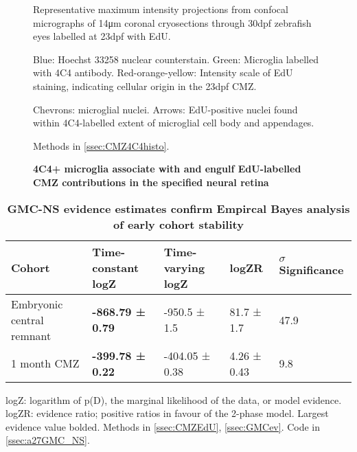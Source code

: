 \begin{figure}[!h]
    \caption{{\bf 4C4+ microglia associate with and engulf EdU-labelled CMZ contributions in the specified neural retina}}
    Representative maximum intensity projections from confocal micrographs of 14\si{\micro\metre} coronal cryosections through 30dpf zebrafish eyes labelled at 23dpf with EdU.
    
    Blue: Hoechst 33258 nuclear counterstain. Green: Microglia labelled with 4C4 antibody. Red-orange-yellow: Intensity scale of EdU staining, indicating cellular origin in the 23dpf CMZ.

    Chevrons: microglial nuclei. Arrows: EdU-positive nuclei found within 4C4-labelled extent of microglial cell body and appendages.
    
    Methods in \autoref{ssec:CMZ4C4histo}.
    \label{4C4micrograph}
\end{figure}

\begin{table}[!ht]
    \centering
    \caption{{\bf GMC-NS evidence estimates confirm Empircal Bayes analysis of early cohort stability}}
    \begin{tabular}{|l|l|l|l|l|} \hline 
        {\bf Cohort} & {\bf Time-constant logZ} & {\bf Time-varying logZ} & {\bf logZR} & {\bf $\sigma$ Significance}\\ \hline
        Embryonic central remnant & {\bf -868.79 ± 0.79} & -950.5 ± 1.5 & 81.7 ± 1.7 & 47.9\\ \hline
        1 month CMZ & {\bf -399.78 ± 0.22} & -404.05 ± 0.38 & 4.26 ± 0.43 & 9.8\\ \hline
    \end{tabular}
    \begin{flushleft} logZ: logarithm of p(D), the marginal likelihood of the data, or model evidence. logZR: evidence ratio; positive ratios in favour of the 2-phase model. Largest evidence value bolded.
    Methods in \autoref{ssec:CMZEdU}, \autoref{ssec:GMCev}.
    Code in \autoref{ssec:a27GMC_NS}.
    \end{flushleft}
    \label{turnoverGMCtable}
\end{table}

